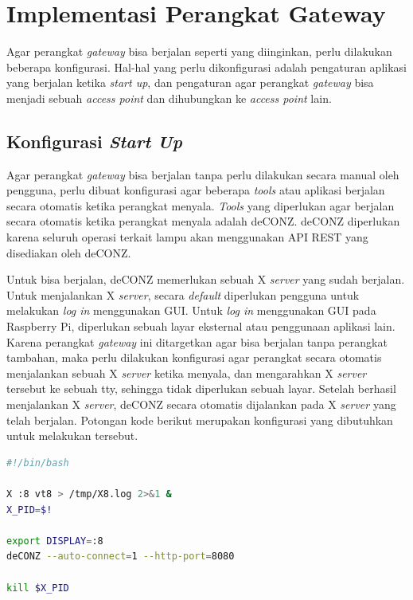 

\section{Implementasi Perangkat Gateway}
Agar perangkat \textit{gateway} bisa berjalan seperti yang diinginkan, perlu dilakukan beberapa konfigurasi. Hal-hal yang perlu dikonfigurasi adalah pengaturan aplikasi yang berjalan ketika \textit{start up}, dan pengaturan agar perangkat \textit{gateway} bisa menjadi sebuah \textit{access point} dan dihubungkan ke \textit{access point} lain.

\subsection{Konfigurasi \textit{Start Up}}
Agar perangkat \textit{gateway} bisa berjalan tanpa perlu dilakukan secara manual oleh pengguna, perlu dibuat konfigurasi agar beberapa \textit{tools} atau aplikasi berjalan secara otomatis ketika perangkat menyala. \textit{Tools} yang diperlukan agar berjalan secara otomatis ketika perangkat menyala adalah deCONZ. deCONZ diperlukan karena seluruh operasi terkait lampu akan menggunakan API REST yang disediakan oleh deCONZ.

Untuk bisa berjalan, deCONZ memerlukan sebuah X \textit{server} yang sudah berjalan. Untuk menjalankan X \textit{server}, secara \textit{default} diperlukan pengguna untuk melakukan \textit{log in} menggunakan GUI. Untuk \textit{log in} menggunakan GUI pada Raspberry Pi, diperlukan sebuah layar eksternal atau penggunaan aplikasi lain. Karena perangkat \textit{gateway} ini ditargetkan agar bisa berjalan tanpa perangkat tambahan, maka perlu dilakukan konfigurasi agar perangkat secara otomatis menjalankan sebuah X \textit{server} ketika menyala, dan mengarahkan X \textit{server} tersebut ke sebuah tty, sehingga tidak diperlukan sebuah layar. Setelah berhasil menjalankan X \textit{server}, deCONZ secara otomatis dijalankan pada X \textit{server} yang telah berjalan. Potongan kode berikut merupakan konfigurasi yang dibutuhkan untuk melakukan tersebut.

\begin{lstlisting}[language=bash,caption=kode untuk menjalankan X \textit{server} dan memulai deCONZ]
#!/bin/bash

X :8 vt8 > /tmp/X8.log 2>&1 &
X_PID=$!

export DISPLAY=:8
deCONZ --auto-connect=1 --http-port=8080

kill $X_PID
\end{lstlisting}

